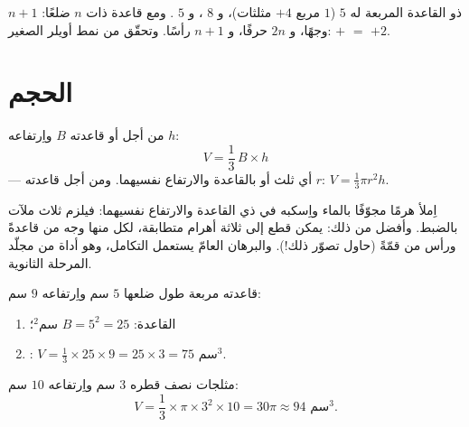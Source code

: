 \begin{example}\label{ex:g8:solids:count}
 ذو القاعدة المربعة له $5$  ($1$ مربع $+ 4$
مثلثات)، و $8$ ، و $5$ . ومع قاعدة ذات $n$ ضلعًا:
$n + 1$ وجهًا، و $2n$ حرفًا، و $n + 1$ رأسًا. وتحقّق من نمط أويلر
الصغير:  $+$  $=$  $+ 2$.
\end{example}

\section{الحجم}

\begin{theorem}\label{thm:g8:solids:volume}
من أجل  أو   قاعدته $B$ واِرتفاعه $h$:
\[
V = \frac{1}{3}\, B \times h
\]
--- أي ثلث  أو  بالقاعدة والارتفاع نفسيهما.
ومن أجل   قاعدته $r$: $V = \frac13 \pi r^2 h$.
\end{theorem}
\admitted

\begin{remark}
اِملأ هرمًا مجوّفًا بالماء واِسكبه في  ذي القاعدة
والارتفاع نفسيهما: فيلزم ثلاث ملآت بالضبط. وأفضل من ذلك: يمكن قطع
 إلى ثلاثة أهرام متطابقة، لكل منها وجه من
 قاعدةً ورأس من  قمّةً (حاول تصوّر ذلك!).
والبرهان العامّ يستعمل التكامل، وهو أداة من مجلّد المرحلة الثانوية.
\end{remark}

\begin{example}\label{ex:g8:solids:volume}
 قاعدته مربعة طول ضلعها $5$ سم واِرتفاعه $9$ سم:
\begin{enumerate}
  \item {} القاعدة: $B = 5^2 = 25$ سم$^2$؛
  \item {}: $V = \frac13 \times 25 \times 9 = 25 \times 3 = 75$
        سم$^3$.
\end{enumerate}
 مثلجات نصف قطره $3$ سم واِرتفاعه $10$ سم:
\[
V = \frac13 \times \pi \times 3^2 \times 10 = 30\pi \approx 94
\text{ سم}^3 .
\]
\end{example}

